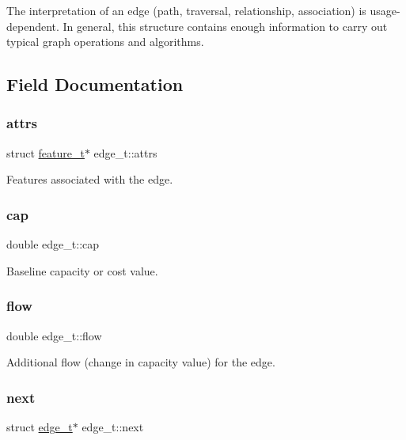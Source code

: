 The interpretation of an edge (path, traversal, relationship, association) is usage-\/dependent. In general, this structure contains enough information to carry out typical graph operations and algorithms. 

\subsection{Field Documentation}
\mbox{\label{structedge__t_afef8b0abae38e565a0c21a3f9c863870}} 
\subsubsection{\texorpdfstring{attrs}{attrs}}
{\footnotesize\ttfamily struct \hyperlink{structfeature__t}{feature\+\_\+t}$\ast$ edge\+\_\+t\+::attrs}

Features associated with the edge. \mbox{\label{structedge__t_a008f610ba47f30e49b6350e4bb00d6aa}} 
\subsubsection{\texorpdfstring{cap}{cap}}
{\footnotesize\ttfamily double edge\+\_\+t\+::cap}

Baseline capacity or cost value. \mbox{\label{structedge__t_a45d88baf5d0fa8abd4b512e6856b9b2d}} 
\subsubsection{\texorpdfstring{flow}{flow}}
{\footnotesize\ttfamily double edge\+\_\+t\+::flow}

Additional flow (change in capacity value) for the edge. \mbox{\label{structedge__t_a1e36360af59a1ec80463b82e00362480}} 
\subsubsection{\texorpdfstring{next}{next}}
{\footnotesize\ttfamily struct \hyperlink{structedge__t}{edge\+\_\+t}$\ast$ edge\+\_\+t\+::next}



